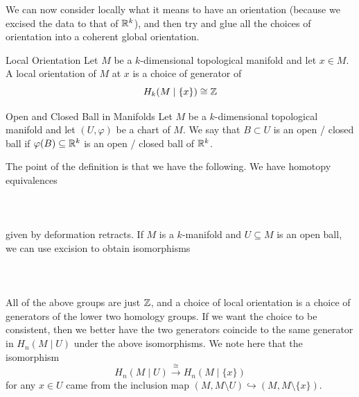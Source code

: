\documentclass[a4paper]{article}
\begin{document}
We can now consider locally what it means to have an orientation (because we excised the data to that of $\mathbb{R}^k$), and then try and glue all the choices of orientation into a coherent global orientation. 

\begin{defn}{Local Orientation}{} Let $M$ be a $k$-dimensional topological manifold and let $x\in M$. A local orientation of $M$ at $x$ is a choice of generator of $$H_k(M\;|\;\{x\})\cong\mathbb{Z}$$
\end{defn}

\begin{defn}{Open and Closed Ball in Manifolds}{} Let $M$ be a $k$-dimensional topological manifold and let $(U,\varphi)$ be a chart of $M$. We say that $B\subset U$ is an open / closed ball if $\varphi(B)\subseteq\mathbb{R}^k$ is an open / closed ball of $\mathbb{R}^k$. 
\end{defn}

The point of the definition is that we have the following. We have homotopy equivalences \\~\\
\\~\\
given by deformation retracts. If $M$ is a $k$-manifold and $U\subseteq M$ is an open ball, we can use excision to obtain isomorphisms \\~\\
\\~\\
All of the above groups are just $\mathbb{Z}$, and a choice of local orientation is a choice of generators of the lower two homology groups. If we want the choice to be consistent, then we better have the two generators coincide to the same generator in $H_n(M\;|\;U)$ under the above isomorphisms. We note here that the isomorphism $$H_n(M\;|\;U)\overset{\cong}{\longrightarrow}H_n(M\;|\;\{x\})$$ for any $x\in U$ came from the inclusion map $(M,M\setminus U)\hookrightarrow(M,M\setminus\{x\})$. 
\end{document}
